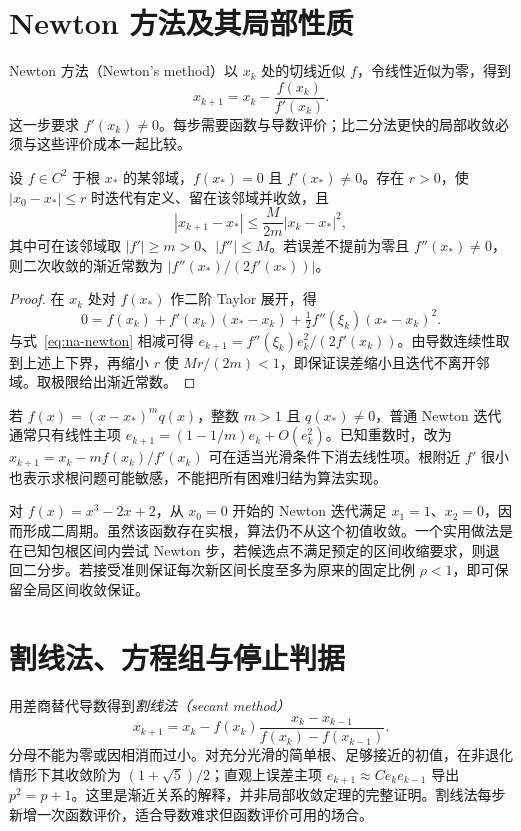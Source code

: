 \documentclass[UTF8,12pt,a4paper,fontset=fandol]{ctexbook}
\begin{document}
\section{Newton 方法及其局部性质}
Newton 方法（Newton's method）以 $x_k$ 处的切线近似 $f$，令线性近似为零，得到
\begin{equation}
 x_{k+1}=x_k-\frac{f(x_k)}{f'(x_k)}.
 \label{eq:na-newton}
\end{equation}
这一步要求 $f'(x_k)\ne0$。每步需要函数与导数评价；比二分法更快的局部收敛必须与这些评价成本一起比较。

\begin{theorem}
\label{thm:na-newton}
设 $f\in C^2$ 于根 $x_*$ 的某邻域，$f(x_*)=0$ 且 $f'(x_*)\ne0$。存在 $r>0$，使 $|x_0-x_*|\le r$ 时迭代有定义、留在该邻域并收敛，且
\[
 |x_{k+1}-x_*|\le \frac{M}{2m}|x_k-x_*|^2,
\]
其中可在该邻域取 $|f'|\ge m>0$、$|f''|\le M$。若误差不提前为零且 $f''(x_*)\ne0$，则二次收敛的渐近常数为 $|f''(x_*)/(2f'(x_*))|$。
\end{theorem}
\begin{proof}
在 $x_k$ 处对 $f(x_*)$ 作二阶 Taylor 展开，得
\[
 0=f(x_k)+f'(x_k)(x_*-x_k)+\tfrac12 f''(\xi_k)(x_*-x_k)^2.
\]
与式~\eqref{eq:na-newton} 相减可得 $e_{k+1}=f''(\xi_k)e_k^2/(2f'(x_k))$。由导数连续性取到上述上下界，再缩小 $r$ 使 $Mr/(2m)<1$，即保证误差缩小且迭代不离开邻域。取极限给出渐近常数。
\end{proof}

若 $f(x)=(x-x_*)^m q(x)$，整数 $m>1$ 且 $q(x_*)\ne0$，普通 Newton 迭代通常只有线性主项 $e_{k+1}=(1-1/m)e_k+O(e_k^2)$。已知重数时，改为 $x_{k+1}=x_k-mf(x_k)/f'(x_k)$ 可在适当光滑条件下消去线性项。根附近 $f'$ 很小也表示求根问题可能敏感，不能把所有困难归结为算法实现。

\begin{example}[局部结论不能当作全局结论]
对 $f(x)=x^3-2x+2$，从 $x_0=0$ 开始的 Newton 迭代满足 $x_1=1$、$x_2=0$，因而形成二周期。虽然该函数存在实根，算法仍不从这个初值收敛。一个实用做法是在已知包根区间内尝试 Newton 步，若候选点不满足预定的区间收缩要求，则退回二分步。若接受准则保证每次新区间长度至多为原来的固定比例 $\rho<1$，即可保留全局区间收敛保证。
\end{example}

\section{割线法、方程组与停止判据}
用差商替代导数得到\emph{割线法（secant method）}
\[
 x_{k+1}=x_k-f(x_k)\frac{x_k-x_{k-1}}{f(x_k)-f(x_{k-1})}.
\]
分母不能为零或因相消而过小。对充分光滑的简单根、足够接近的初值，在非退化情形下其收敛阶为 $(1+\sqrt5)/2$；直观上误差主项 $e_{k+1}\approx C e_ke_{k-1}$ 导出 $p^2=p+1$。这里是渐近关系的解释，并非局部收敛定理的完整证明。割线法每步新增一次函数评价，适合导数难求但函数评价可用的场合。
\end{document}
